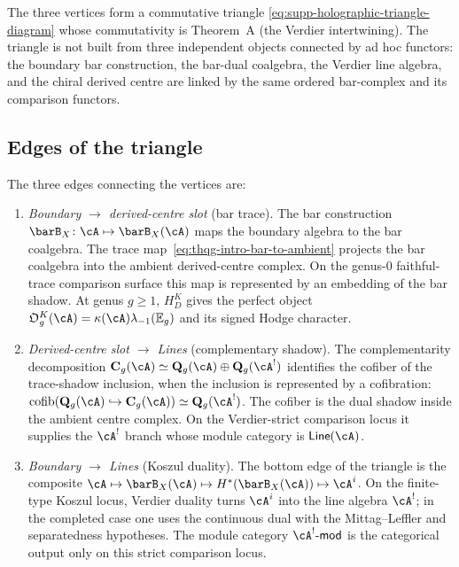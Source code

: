 The three vertices form a commutative triangle
\eqref{eq:supp-holographic-triangle-diagram} whose commutativity is
Theorem~A (the Verdier intertwining). The triangle is not built from
three independent objects connected by ad hoc functors: the boundary
bar construction, the bar-dual coalgebra, the Verdier line algebra,
and the chiral derived centre are linked by the same ordered
bar-complex and its comparison functors.

\subsection{Edges of the triangle}
\label{subsec:thqg-intro-triangle-edges}

The three edges connecting the vertices are:

\begin{enumerate}[label=\textup{(\roman*)}]
\item \emph{Boundary $\to$ derived-centre slot} (bar trace).
 The bar construction $\barB_X \colon \cA \mapsto \barB_X(\cA)$
 maps the boundary algebra to the bar coalgebra. The trace
 map~\eqref{eq:thqg-intro-bar-to-ambient} projects the bar
 coalgebra into the ambient derived-centre complex. On the genus-$0$
 faithful-trace comparison surface this map is represented by an
embedding of the bar shadow.  At genus $g\ge1$, $H_D^K$ gives the
perfect object $\mathfrak O_g^K(\cA)=
\kappa(\cA)\lambda_{-1}(\mathbb E_g)$ and its signed Hodge character.

\item \emph{Derived-centre slot $\to$ Lines} (complementary shadow).
 The complementarity decomposition
 $\mathbf{C}_g(\cA) \simeq \mathbf{Q}_g(\cA) \oplus \mathbf{Q}_g(\cA^!)$
 identifies the cofiber of the trace-shadow inclusion, when the
 inclusion is represented by a cofibration:
 $\operatorname{cofib}(\mathbf{Q}_g(\cA) \hookrightarrow \mathbf{C}_g(\cA))
 \simeq \mathbf{Q}_g(\cA^!)$.
 The cofiber is the dual shadow inside the ambient centre complex.
 On the Verdier-strict comparison locus it supplies the $\cA^!$ branch
 whose module category is $\mathsf{Line}(\cA)$.

\item \emph{Boundary $\to$ Lines} (Koszul duality).
 The bottom edge of the triangle is the composite
 $\cA \mapsto \barB_X(\cA) \mapsto H^*(\barB_X(\cA)) \mapsto
 \cA^i$.  On the finite-type Koszul locus, Verdier duality turns
 $\cA^i$ into the line algebra $\cA^!$; in the completed case one uses
 the continuous dual with the Mittag--Leffler and separatedness
 hypotheses. The module category $\cA^!\text{-}\mathsf{mod}$ is the
 categorical output only on this strict comparison locus.
\end{enumerate}

